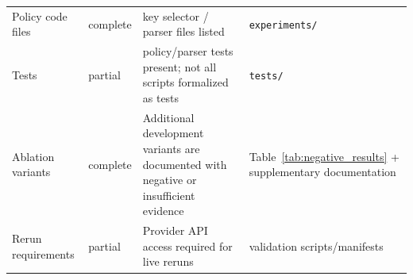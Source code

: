 \begin{table}[t]
\begin{tabularx}{\textwidth}{@{}>{\raggedright\arraybackslash}p{}>{\raggedright\arraybackslash}p{}>{\raggedright\arraybackslash}X>{\raggedright\arraybackslash}p{}@{}}
Policy code files & complete & key selector / parser files listed & \nolinkurl{experiments/} \\
Tests & partial & policy/parser tests present; not all scripts formalized as tests & \texttt{tests/} \\
Ablation variants & complete & Additional development variants are documented with negative or insufficient evidence & Table~\ref{tab:negative_results} + supplementary documentation \\
Rerun requirements & partial & Provider API access required for live reruns & validation scripts/manifests \\
\bottomrule
\end{tabularx}
\end{table}
